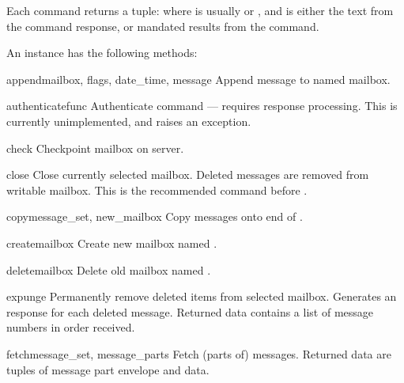 Each command returns a tuple:  where  is usually  or ,
and  is either the text from the command response, or
mandated results from the command.

An  instance has the following methods:


\begin{methoddesc}{append}{mailbox, flags, date_time, message}
  Append message to named mailbox. 
\end{methoddesc}

\begin{methoddesc}{authenticate}{func}
  Authenticate command --- requires response processing. This is
  currently unimplemented, and raises an exception. 
\end{methoddesc}

\begin{methoddesc}{check}{}
  Checkpoint mailbox on server. 
\end{methoddesc}

\begin{methoddesc}{close}{}
  Close currently selected mailbox. Deleted messages are removed from
  writable mailbox. This is the recommended command before
  .
\end{methoddesc}

\begin{methoddesc}{copy}{message_set, new_mailbox}
  Copy  messages onto end of . 
\end{methoddesc}

\begin{methoddesc}{create}{mailbox}
  Create new mailbox named .
\end{methoddesc}

\begin{methoddesc}{delete}{mailbox}
  Delete old mailbox named .
\end{methoddesc}

\begin{methoddesc}{expunge}{}
  Permanently remove deleted items from selected mailbox. Generates an
   response for each deleted message. Returned data
  contains a list of  message numbers in order
  received.
\end{methoddesc}

\begin{methoddesc}{fetch}{message_set, message_parts}
  Fetch (parts of) messages. Returned data are tuples of message part
  envelope and data.
\end{methoddesc}

